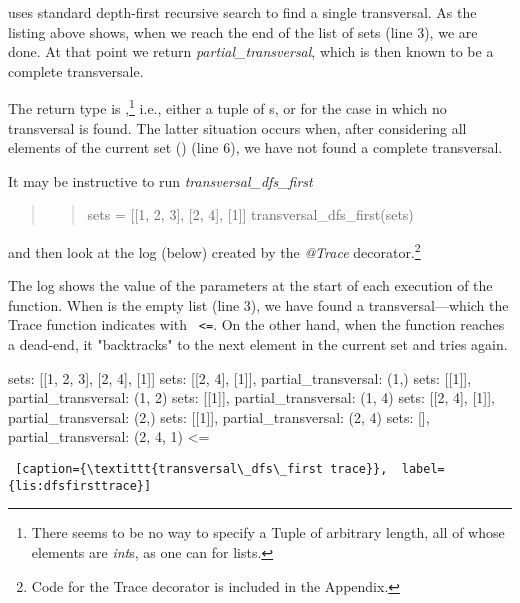 \smallv

 uses standard depth-first recursive search to find a single transversal. As the listing above shows, when we reach the end of the list of sets (line 3), we are done. At that point we return  \textit{partial\_transversal}, which is then known to be a complete transversale. 

The return type is ,\footnote{There seems to be no way to specify a Tuple of arbitrary length, all of whose elements are \textit{int}s, as one can for lists.} i.e., either a tuple of s, or  for the case in which no transversal is found. The latter situation occurs when, after considering all elements of the current set () (line 6), we have not found a complete transversal.  

It may be instructive to run \textit{transversal\_dfs\_first}
\begin{quote}
\begin{quote}
\begin{python}
sets = [[1, 2, 3], [2, 4], [1]]
transversal_dfs_first(sets)
\end{python}
\end{quote}
\end{quote}
and then look at the log (below) created by the \textit{@Trace} decorator.\footnote{Code for the Trace decorator is included in the Appendix.} 

The log shows the value of the parameters at the start of each execution of the function. When  is the empty list (line 3), we have found a transversal---which the Trace function indicates with \texttt{ <=}. On the other hand, when the function reaches a dead-end, it "backtracks" to the next element in the current set and tries again. 

\begin{minipage}{\linewidth}  \largev   \hrulefill
\begin{python}[numbers=left]
sets: [[1, 2, 3], [2, 4], [1]]
  sets: [[2, 4], [1]], partial_transversal: (1,)
    sets: [[1]], partial_transversal: (1, 2)
    sets: [[1]], partial_transversal: (1, 4)
  sets: [[2, 4], [1]], partial_transversal: (2,)
    sets: [[1]], partial_transversal: (2, 4)
      sets: [], partial_transversal: (2, 4, 1) <=
\end{python}
\begin{lstlisting} [caption={\textittt{transversal\_dfs\_first trace}},  label={lis:dfsfirsttrace}]
\end{lstlisting}
\end{minipage}

